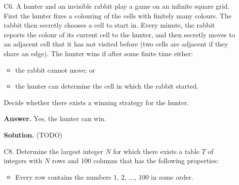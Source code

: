 \documentclass[11pt,a4paper]{article}
\begin{document}
\begin{enumerate}
\begin{proof}
        	Conversely, if we have such a collection of $A\to v_1\Rightarrow v_2\to B$, then these collections have edges disjoint from $A\to v\to B$, so such addition is valid. It therefore means we can pick the collection with maximum number of paths. 
        \end{proof}
        To finish, denote $C_{AB}$ as the quantity described in Lemma \ref{lemma_c4b}. 
        Such paths do not depend on $A$ and $B$ other than that we have in- and out-types of edges, so $C_{AB}=C_{BA}$. 
        Therefore, 
        \[
        N_{AB} = C_{AB} + 1\{A\to B\} + |\{v: \vec{AB}-\text{type}\}|
        \qquad 
        N_{BA} = C_{BA} + 1\{B\to A\} + |\{v: \vec{BA}-\text{type}\}|
        \]
        where $1\{A\to B\}$ means there's a directed edge $A\to B$. 
	    so $N_{AB}-N_{BA} = 1\{A\to B\} + |\{v: \vec{AB}-\text{type}\}| - (1\{B\to A\} + |\{v: \vec{BA}-\text{type}\}|)$. 
	    Given also that the out degree of $A$, $\text{out}(A)$ is given by 
	    $1\{A\to B\} + |\{v: \vec{AB}-\text{type}\}| + |\{v: \text{out-type}\}|$, 
	    we have 
	    \[
	    N_{AB} - N_{BA} = \text{out}(A) - \text{out}(B)
	    \]
	    as desired. 
	    
	    \item [C6.]
	    A hunter and an invisible rabbit play a game on an infinite square grid. First the hunter fixes a colouring of the cells with finitely many colours. The rabbit then secretly chooses a cell to start in. Every minute, the rabbit reports the colour of its current cell to the hunter, and then secretly moves to an adjacent cell that it has not visited before (two cells are adjacent if they share an edge). The hunter wins if after some finite time either:
	    \begin{itemize}
	    	\item the rabbit cannot move; or
	    	
	    	\item the hunter can determine the cell in which the rabbit started.
	    \end{itemize}
	    
	    Decide whether there exists a winning strategy for the hunter.
	    
	    \textbf{Answer.} Yes, the hunter can win. 
	    
	    \textbf{Solution.} (TODO)
	    
	    \item [C8.] 
	    Determine the largest integer $N$ for which there exists a table $T$ of integers with $N$ rows and $100$ columns that has the following properties:
	    \begin{itemize}
	    	\item Every row contains the numbers $1$, $2$, $\ldots$, $100$ in some order.
	    	

\end{itemize}
\end{enumerate}
\end{document}
